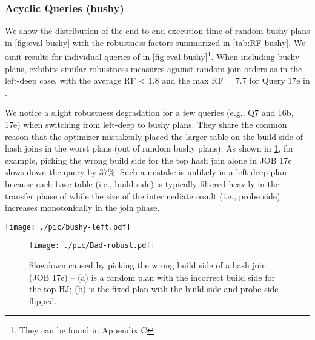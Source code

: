 \subsubsection{Acyclic Queries (bushy)}
We show the distribution of the end-to-end execution time of random bushy plans in \cref{fig:eval-bushy} with the robustness factors summarized in \cref{tab:RF-bushy}. We omit results for individual queries of \tpcds in \cref{fig:eval-bushy}\footnote{They can be found in Appendix C}. When including bushy plans, \rpt exhibits similar robustness measures against random join orders as in the left-deep case, with the average RF < 1.8 and the max RF = 7.7 for Query 17e in \job. 


We notice a slight robustness degradation for a few queries (e.g., \tpch Q7 and \job 16b, 17e) when switching from left-deep to bushy plans. They share the common reason that the optimizer mistakenly placed the larger table on the build side of hash joins in the worst plans (out of random bushy plans). As shown in \cref{fig:wrong-build-side}, for example, picking the wrong build side for the top hash join alone in JOB 17e slows down the query by $37\%$. Such a mistake is unlikely in a left-deep plan because each base table (i.e., build side) is typically filtered heavily in the transfer phase of \rpt while the size of the intermediate result (i.e., probe side) increases monotonically in the join phase.

\begin{figure*}[t!]
    \centering
    \texttt{[image: ./pic/bushy-left.pdf]}
    \caption{Speed up of bushy over left-deep plans. \textnormal{-- We draw the minimum execution time of \rpt out of random left-deep/bushy plans as well as the execution time of \rpt with the optimizer's left-deep/bushy plan for each query in \tpch and \job.}}
    \label{fig:left-bushy}
\end{figure*}

\begin{figure}[t!]
    \centering
    \texttt{[image: ./pic/Bad-robust.pdf]}
    \caption{Slowdown caused by picking the wrong build side of a hash join (JOB 17e) \textnormal{-- (a) is a random plan with the incorrect build side for the top HJ; (b) is the fixed plan with the build side and probe side flipped.}}
    \label{fig:wrong-build-side}
\end{figure}

